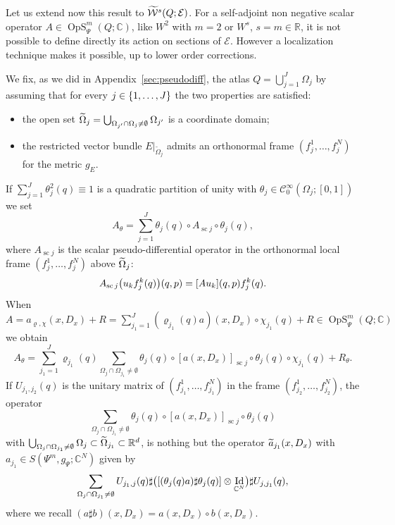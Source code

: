 \documentclass[AHL,Unicode,longabstracts]{cedram}
\newcommand{\C}{\mathbb{C}}
\newcommand{\R}{\mathbb{R}}
\newcommand{\clW}{\mathcal{W}}
\newcommand{\clC}{\mathcal{C}}
\newcommand{\clE}{\mathcal{E}}
\DeclareMathOperator{\OpS}{OpS}
\DeclareMathOperator{\Idd}{Id}
\DeclareMathOperator{\scc}{sc}
\let\oldtilde\tilde
\renewcommand*{\tilde}[1]{\mathchoice{\widetilde{#1}}{\widetilde{#1}}{\oldtilde{#1}}{\oldtilde{#1}}}
\let\originalleft\left
\let\originalright\right
\renewcommand{\left}{\mathopen{}\mathclose\bgroup\originalleft}
\renewcommand{\right}{\aftergroup\egroup\originalright}
\begin{document}
Let us extend now this result to $\tilde{\clW}^{s}(Q;\clE)$. For a self-adjoint non negative scalar operator $A\in \OpS^{m}_{\Psi}(Q;\C)$, like $W^{2}$ with $m=2$ or $W^{s}$, $s=m\in \R$, it is not possible to define directly its action on sections of $\clE$. However a localization technique makes it possible, up to lower order corrections.

We fix, as we did in Appendix~\ref{sec:pseudodiff}, the atlas $Q=\bigcup_{j=1}^{J}\Omega_{j}$ by assuming that for every $j\in \left\{1,\dots, J\right\}$ the two properties are satisfied:
\begin{itemize}
\item the open set $\tilde{\Omega}_{j}=\bigcup_{\Omega_{j'}\cap \Omega_{j}\neq \emptyset}\Omega_{j'}$ is a coordinate domain;
\item the restricted vector bundle $E|_{\widetilde{\Omega}_{j}}$ admits an orthonormal frame $(f_{j}^{1},\dots,f_{j}^{N})$ for the metric $g_{E}$.
\end{itemize}
If $\sum_{j=1}^{J}\theta_{j}^{2}(q)\equiv 1$ is a quadratic partition of unity with $\theta_{j}\in \clC^{\infty}_{0}(\Omega_{j};[0,1])$ we set
\[
A_{\theta}=\sum_{j=1}^{J}\theta_{j}(q)\circ A_{\scc j}\circ \theta_{j}(q),
\]
where $A_{\scc j}$ is the scalar pseudo-differential operator in the orthonormal local frame $(f_{j}^{1},\dots,f_{j}^{N})$ above $\tilde{\Omega}_{j}$:
\[
A_{\scc j}\left(u_{k}f_{j}^{k}(q)\right)(q,p) =[Au_{k}](q,p)f_{j}^{k}(q).
\]
When $A=a_{\varrho,\chi}(x,D_{x})+R=\sum_{j_{1}=1}^{J}(\varrho_{j_{1}}(q)a)(x,D_{x})\circ\chi_{j_{1}}(q)+R\in \OpS^{m}_{\Psi}(Q;\C)$\linebreak we obtain
\[
A_{\theta}=\sum_{j_{1}=1}^{J}\varrho_{j_{1}}(q)\sum_{\Omega_{j}\cap \Omega_{j_{1}}\neq\emptyset }\theta_{j}(q)\circ [a(x,D_{x})]_{\scc j}\circ \theta_{j}(q)\circ \chi_{j_{1}}(q)+R_{\theta}.
\]
If $U_{j_{1},j_{2}}(q)$ is the unitary matrix of $(f_{j_{1}}^{1},\dots, f_{j_{1}}^{N})$ in the frame $(f_{j_{2}}^{1},\dots, f_{j_{2}}^{N})$, the operator
\[
\sum_{\Omega_{j}\cap \Omega_{j_{1}}\neq\emptyset}
\theta_{j}(q)\circ [a(x,D_{x})]_{\scc j}\circ \theta_{j}(q)
\]
with $\bigcup_{\Omega_{j}\cap \Omega_{j_{1}}\neq \emptyset}\Omega_{j}\subset \tilde{\Omega}_{j_{1}}\subset \R^{d}$, is nothing but the operator $\tilde{a}_{j_{1}}(x,D_{x})$ with $a_{j_{1}}\in S(\Psi^{m},g_{\Psi};\C^{N})$ given by
\[
\sum_{\Omega_{j}\cap \Omega_{j_{1}}\neq \emptyset} U_{j_{1},j}(q)\sharp \bigl(\left[(\theta_{j}(q)a)\sharp \theta_{j}(q)\right]\otimes \Idd_{\C^{N}}\bigr)\sharp U_{j,j_{1}}(q),
\]
where we recall $(a\sharp b)(x,D_{x})=a(x,D_{x})\circ b(x,D_{x})$.
\end{document}
